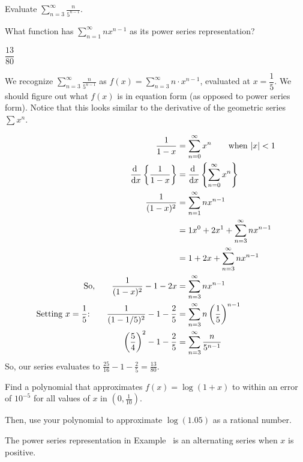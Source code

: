 \begin{Mquestion}
	Evaluate $\displaystyle \sum_{n=3}^\infty \frac{n}{5^{n-1}}$.
\end{Mquestion}
\begin{hint}
	What function has $\displaystyle\sum_{n=1}^\infty nx^{n-1}$ as its power series representation?
\end{hint}
\begin{answer}
	$\dfrac{13}{80}$
\end{answer}
\begin{solution}
	We recognize
	$\displaystyle \sum_{n=3}^\infty \frac{n}{5^{n-1}}$ as
	$f(x)=\displaystyle \sum_{n=3}^\infty n\cdot x^{n-1}$, evaluated at $x=\dfrac15$. We should figure out what $f(x)$ is in equation form (as opposed to power series form). Notice that this looks similar to the derivative of the geometric series $\displaystyle\sum x^n$.

	\begin{align*}
	\frac{1}{1-x}&=\sum_{n=0}^\infty x^n \qquad \text{when $|x|<1$}\\
	\diff{}{x}\left\{\frac{1}{1-x}\right\}&=\diff{}{x}\left\{\sum_{n=0}^\infty x^n\right\}\\
	\frac{1}{(1-x)^2}&=\sum_{n=1}^\infty nx^{n-1}\\
	&= 1x^0 + 2x^1+\sum_{n=3}^\infty nx^{n-1}\\
	&= 1 + 2x+\sum_{n=3}^\infty nx^{n-1}\\
	\text{So,}\qquad
	\frac{1}{(1-x)^2}-1-2x&=\sum_{n=3}^\infty nx^{n-1}\\
	\text{Setting $x=\dfrac15$:}\qquad
	\frac{1}{(1-1/5)^2}-1-\frac25&=\sum_{n=3}^\infty n\left(\frac15\right)^{n-1}\\
	\left(\frac{5}{4} \right)^2-1-\frac25&=\sum_{n=3}^\infty \frac{n}{5^{n-1}}\\
	\end{align*}
	So,  our series evaluates to $\displaystyle\frac{25}{16}-1-\frac{2}{5}=\frac{13}{80}$.
\end{solution}
\begin{Mquestion}
Find a polynomial that approximates $f(x)=\log(1+ x)$  to within an error of $10^{-5}$ for all values of $x$ in $\left(0,\frac{1}{10}\right)$.

Then, use your polynomial to approximate $\log(1.05)$ as a rational number.
\end{Mquestion}
\begin{hint}
The power series representation in Example~ is an alternating series when $x$ is positive.
\end{hint}

